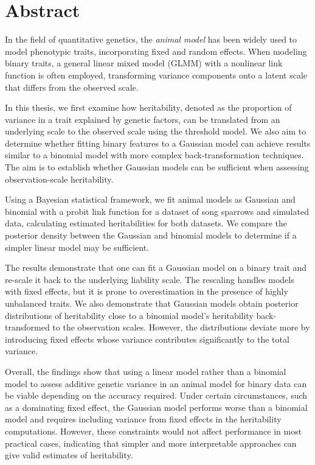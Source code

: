 \chapter*{Abstract}

In the field of quantitative genetics, the \textit{animal model} has been widely used to model phenotypic traits, incorporating fixed and random effects. When modeling binary traits, a general linear mixed model (GLMM) with a nonlinear link function is often employed,  transforming variance components onto a latent scale that differs from the observed scale.

In this thesis, we first examine how heritability, denoted as the proportion of variance in a trait explained by genetic factors, can be translated from an underlying scale to the observed scale using the threshold model. We also aim to determine whether fitting binary features to a Gaussian model can achieve results similar to a binomial model with more complex back-transformation techniques. The aim is to establish whether Gaussian models can be sufficient when assessing observation-scale heritability.

Using a Bayesian statistical framework, we fit animal models as Gaussian and binomial with a probit link function for a dataset of song sparrows and simulated data, calculating estimated heritabilities for both datasets. We compare the posterior density between the Gaussian and binomial models to determine if a simpler linear model may be sufficient.

The results demonstrate that one can fit a Gaussian model on a binary trait and re-scale it back to the underlying liability scale. The rescaling handles models with fixed effects, but it is prone to overestimation in the presence of highly unbalanced traits. We also demonstrate that Gaussian models obtain posterior distributions of heritability close to a binomial model's heritability back-transformed to the observation scales. However, the distributions deviate more by introducing fixed effects whose variance contributes significantly to the total variance.

Overall, the findings show that using a linear model rather than a binomial model to assess additive genetic variance in an animal model for binary data can be viable depending on the accuracy required. Under certain circumstances, such as a dominating fixed effect, the Gaussian model performs worse than a binomial model and requires including variance from fixed effects in the heritability computations. However, these constraints would not affect performance in most practical cases, indicating that simpler and more interpretable approaches can give valid estimates of heritability.